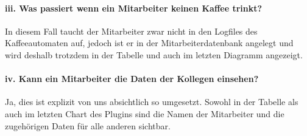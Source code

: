 \documentclass[a4paper,12pt,]{article}
\begin{document}
\paragraph{iii. Was passiert wenn ein Mitarbeiter keinen Kaffee trinkt?}
In diesem Fall taucht der Mitarbeiter zwar nicht in den Logfiles des Kaffeeautomaten auf, jedoch ist er in der Mitarbeiterdatenbank angelegt und wird deshalb trotzdem in der Tabelle und auch im letzten Diagramm angezeigt.

\paragraph{iv. Kann ein Mitarbeiter die Daten der Kollegen einsehen?}
Ja, dies ist explizit von uns absichtlich so umgesetzt. Sowohl in der Tabelle als auch im letzten Chart des Plugins sind die Namen der Mitarbeiter und die zugehörigen Daten für alle anderen sichtbar.
\end{document}
